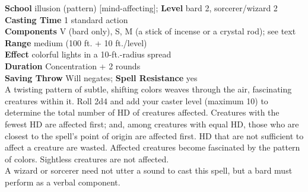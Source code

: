 \textbf{School} illusion (pattern) [mind-affecting]; \textbf{Level} bard 2, sorcerer/wizard 2\\
\textbf{Casting Time} 1 standard action\\
\textbf{Components} V (bard only), S, M (a stick of incense or a crystal rod); see text\\
\textbf{Range }medium (100 ft. + 10 ft./level)\\
\textbf{Effect} colorful lights in a 10-ft.-radius spread\\
\textbf{Duration} Concentration + 2 rounds\\
\textbf{Saving Throw }Will negates; \textbf{Spell Resistance} yes\\
A twisting pattern of subtle, shifting colors weaves through the air, fascinating creatures within it. Roll 2d4 and add your caster level (maximum 10) to determine the total number of HD of creatures affected. Creatures with the fewest HD are affected first; and, among creatures with equal HD, those who are closest to the spell's point of origin are affected first. HD that are not sufficient to affect a creature are wasted. Affected creatures become fascinated by the pattern of colors. Sightless creatures are not affected.\\
A wizard or sorcerer need not utter a sound to cast this spell, but a bard must perform as a verbal component.\\
